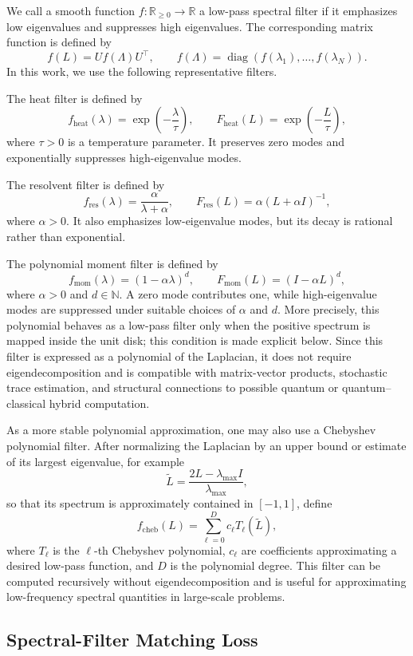 \documentclass[pdflatex,sn-mathphys-ay]{sn-jnl}%
\theoremstyle{thmstyleone}%
\theoremstyle{thmstyletwo}%
\theoremstyle{thmstylethree}%
\begin{document}
We call a smooth function \(f:\mathbb{R}_{\ge0}\to\mathbb{R}\) a low-pass spectral filter if it emphasizes low eigenvalues and suppresses high eigenvalues. The corresponding matrix function is defined by
\[
f(L)=Uf(\Lambda)U^\top,
\qquad
f(\Lambda)=\operatorname{diag}(f(\lambda_1),\ldots,f(\lambda_N)).
\]
In this work, we use the following representative filters.

The heat filter is defined by
\[
f_{\mathrm{heat}}(\lambda)=\exp\left(-\frac{\lambda}{\tau}\right),
\qquad
F_{\mathrm{heat}}(L)=\exp\left(-\frac{L}{\tau}\right),
\]
where \(\tau>0\) is a temperature parameter. It preserves zero modes and exponentially suppresses high-eigenvalue modes.

The resolvent filter is defined by
\[
f_{\mathrm{res}}(\lambda)=\frac{\alpha}{\lambda+\alpha},
\qquad
F_{\mathrm{res}}(L)=\alpha(L+\alpha I)^{-1},
\]
where \(\alpha>0\). It also emphasizes low-eigenvalue modes, but its decay is rational rather than exponential.

The polynomial moment filter is defined by
\[
f_{\mathrm{mom}}(\lambda)=(1-\alpha\lambda)^d,
\qquad
F_{\mathrm{mom}}(L)=(I-\alpha L)^d,
\]
where \(\alpha>0\) and \(d\in\mathbb{N}\). A zero mode contributes one, while high-eigenvalue modes are suppressed under suitable choices of \(\alpha\) and \(d\).
More precisely, this polynomial behaves as a low-pass filter only when the positive spectrum is mapped inside the unit disk; this condition is made explicit below.
Since this filter is expressed as a polynomial of the Laplacian, it does not require eigendecomposition and is compatible with matrix-vector products, stochastic trace estimation, and structural connections to possible quantum or quantum--classical hybrid computation.

As a more stable polynomial approximation, one may also use a Chebyshev polynomial filter.
After normalizing the Laplacian by an upper bound or estimate of its largest eigenvalue, for example
\[
\widetilde{L}=\frac{2L-\lambda_{\max}I}{\lambda_{\max}},
\]
so that its spectrum is approximately contained in \([-1,1]\), define
\[
f_{\mathrm{cheb}}(L)=\sum_{\ell=0}^{D}c_\ell T_\ell(\widetilde{L}),
\]
where \(T_\ell\) is the \(\ell\)-th Chebyshev polynomial, \(c_\ell\) are coefficients approximating a desired low-pass function, and \(D\) is the polynomial degree. This filter can be computed recursively without eigendecomposition and is useful for approximating low-frequency spectral quantities in large-scale problems.

\subsection{Spectral-Filter Matching Loss}
\end{document}
